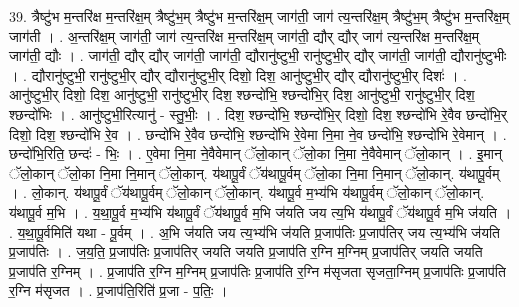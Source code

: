 \documentclass[17pt]{extarticle}
\begin{document}
39. त्रैष्टु॑भ म॒न्तरि॑क्ष म॒न्तरि॑क्ष॒म् त्रैष्टु॑भ॒म् त्रैष्टु॑भ म॒न्तरि॑क्ष॒म् जाग॑ती॒ जाग॑ त्य॒न्तरि॑क्ष॒म् त्रैष्टु॑भ॒म् त्रैष्टु॑भ म॒न्तरि॑क्ष॒म् जाग॑ती । . अ॒न्तरि॑क्ष॒म् जाग॑ती॒ जाग॑ त्य॒न्तरि॑क्ष म॒न्तरि॑क्ष॒म् जाग॑ती॒ द्यौर् द्यौर् जाग॑ त्य॒न्तरि॑क्ष म॒न्तरि॑क्ष॒म् जाग॑ती॒ द्यौः । . जाग॑ती॒ द्यौर् द्यौर् जाग॑ती॒ जाग॑ती॒ द्यौरानु॑ष्टुभी॒ रानु॑ष्टुभी॒र् द्यौर् जाग॑ती॒ जाग॑ती॒ द्यौरानु॑ष्टुभीः । . द्यौरानु॑ष्टुभी॒ रानु॑ष्टुभी॒र् द्यौर् द्यौरानु॑ष्टुभी॒र् दिशो॒ दिश॒ आनु॑ष्टुभी॒र् द्यौर् द्यौरानु॑ष्टुभी॒र् दिशः॑ । . आनु॑ष्टुभी॒र् दिशो॒ दिश॒ आनु॑ष्टुभी॒ रानु॑ष्टुभी॒र् दिश॒ श्छन्दो॑भि॒ श्छन्दो॑भि॒र् दिश॒ आनु॑ष्टुभी॒ रानु॑ष्टुभी॒र् दिश॒ श्छन्दो॑भिः । . आनु॑ष्टुभी॒रित्यानु॑ - स्तु॒भीः॒ । . दिश॒ श्छन्दो॑भि॒ श्छन्दो॑भि॒र् दिशो॒ दिश॒ श्छन्दो॑भि रे॒वैव छन्दो॑भि॒र् दिशो॒ दिश॒ श्छन्दो॑भि रे॒व । . छन्दो॑भि रे॒वैव छन्दो॑भि॒ श्छन्दो॑भि रे॒वेमा नि॒मा ने॒व छन्दो॑भि॒ श्छन्दो॑भि रे॒वेमान् । . छन्दो॑भि॒रिति॒ छन्दः॑ - भिः॒ । . ए॒वेमा नि॒मा ने॒वैवेमान् ॅलो॒कान् ॅलो॒का नि॒मा ने॒वैवेमान् ॅलो॒कान् । . इ॒मान् ॅलो॒कान् ॅलो॒का नि॒मा नि॒मान् ॅलो॒कान्. य॑थापू॒र्वं ॅय॑थापू॒र्वम् ॅलो॒का नि॒मा नि॒मान् ॅलो॒कान्. य॑थापू॒र्वम् । . लो॒कान्. य॑थापू॒र्वं ॅय॑थापू॒र्वम् ॅलो॒कान् ॅलो॒कान्. य॑थापू॒र्व म॒भ्य॑भि य॑थापू॒र्वम् ॅलो॒कान् ॅलो॒कान्. य॑थापू॒र्व म॒भि । . य॒था॒पू॒र्व म॒भ्य॑भि य॑थापू॒र्वं ॅय॑थापू॒र्व म॒भि ज॑यति जय त्य॒भि य॑थापू॒र्वं ॅय॑थापू॒र्व म॒भि ज॑यति । . य॒था॒पू॒र्वमिति॑ यथा - पू॒र्वम् । . अ॒भि ज॑यति जय त्य॒भ्य॑भि ज॑यति प्र॒जाप॑तिः प्र॒जाप॑तिर् जय त्य॒भ्य॑भि ज॑यति प्र॒जाप॑तिः । . ज॒य॒ति॒ प्र॒जाप॑तिः प्र॒जाप॑तिर् जयति जयति प्र॒जाप॑ति र॒ग्नि म॒ग्निम् प्र॒जाप॑तिर् जयति जयति प्र॒जाप॑ति र॒ग्निम् । . प्र॒जाप॑ति र॒ग्नि म॒ग्निम् प्र॒जाप॑तिः प्र॒जाप॑ति र॒ग्नि म॑सृजता सृजता॒ग्निम् प्र॒जाप॑तिः प्र॒जाप॑ति र॒ग्नि म॑सृजत । . प्र॒जाप॑ति॒रिति॑ प्र॒जा - प॒तिः॒ । \newline
\end{document}
